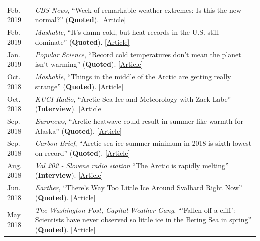 \documentclass[margin,line,palatino,courier,10pt]{res}
\begin{document}
\begin{resume}
\begin{tabular}{@{}p{0.9in}p{4in}}
Feb. 2019 & \textit{CBS News}, ``Week of remarkable weather extremes: Is this the new normal?'' (\textbf{Quoted}). \href{https://www.cbsnews.com/news/remarkable-weather-extremes-is-this-the-new-normal-climate-change/?ftag=CNM-00-10aab7e&linkId=64169123}{[Article]}\\
Feb. 2019 & \textit{Mashable}, ``It's damn cold, but heat records in the U.S. still dominate'' (\textbf{Quoted}). \href{https://mashable.com/article/polar-vortex-climate-change-cold-record/#xQmvXhcFJPqH}{[Article]}\\
Jan. 2019 & \textit{Popular Science}, ``Record cold temperatures don't mean the planet isn't warming'' (\textbf{Quoted}). \href{https://www.popsci.com/cold-weather-climate-change}{[Article]}\\
Oct. 2018 & \textit{Mashable}, ``Things in the middle of the Arctic are getting really strange'' (\textbf{Quoted}). \href{https://mashable.com/article/low-arctic-ice-central-basin/#xQmvXhcFJPqH}{[Article]}\\
Oct. 2018 & \textit{KUCI Radio}, ``Arctic Sea Ice and Meteorology with Zack Labe'' (\textbf{Interview}). \href{https://thesciencespiel.org/2018/10/08/october-8-2018-arctic-sea-ice-and-meteorology-with-zack-labe/}{[Article]}\\
Sep. 2018 & \textit{Euronews}, ``Arctic heatwave could result in summer-like warmth for Alaska'' (\textbf{Quoted}). \href{https://www.euronews.com/2018/09/29/arctic-heatwave-could-result-in-summer-like-warmth-in-alaska}{[Article]}\\
Sep. 2018 & \textit{Carbon Brief}, ``Arctic sea ice summer minimum in 2018 is sixth lowest on record'' (\textbf{Quoted}). \href{https://www.carbonbrief.org/arctic-sea-ice-summer-minimum-in-2018-is-sixth-lowest-on-record}{[Article]}\\
Aug. 2018 & \textit{Val 202 - Slovene radio station} ``The Arctic is rapidly melting'' (\textbf{Interview}). \href{https://val202.rtvslo.si/2018/08/sonce-je-odprlo-zemljin-hladilnik/}{[Article]}\\
Jun. 2018 & \textit{Earther}, ``There's Way Too Little Ice Around Svalbard Right Now'' (\textbf{Quoted}). \href{https://earther.com/theres-way-too-little-ice-around-svalbard-right-now-1826567780}{[Article]}\\
May 2018 & \textit{The Washington Post, Capital Weather Gang}, ``'Fallen off a cliff': Scientists have never observed so little ice in the Bering Sea in spring'' (\textbf{Quoted}). \href{https://www.washingtonpost.com/news/capital-weather-gang/wp/2018/05/03/fallen-off-a-cliff-scientists-have-never-observed-so-little-ice-in-the-bering-sea-in-spring/?noredirect=on&utm_term=.cbcf2781b5e4}{[Article]}\\

\end{tabular}
\end{resume}
\end{document}
